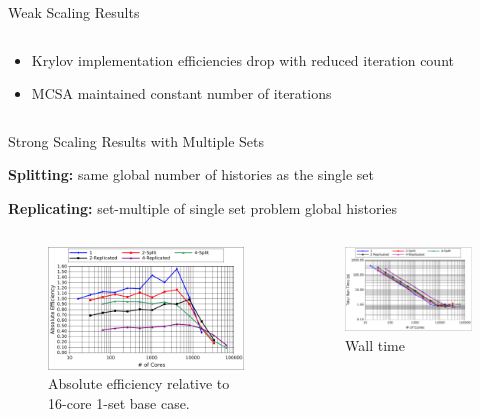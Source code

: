\documentclass{beamer}
\begin{document}
\begin{frame}{Weak Scaling Results}
\begin{columns}
\begin{column}{0.5\textwidth}
      {\small
        \begin{itemize}
        \item Krylov implementation efficiencies drop with
          reduced iteration count
        \item MCSA maintained constant number of iterations
        \end{itemize}
      }

    \end{column}
  \end{columns}


\end{frame}

\begin{frame}{Strong Scaling Results with Multiple Sets}

  \textbf{Splitting:} same global number of histories as the single
  set

  \bigskip 

  \textbf{Replicating:} set-multiple of single set problem global
  histories

  \begin{columns}
    \begin{column}{0.5\textwidth}

      \begin{figure}[htpb!]
        \begin{center}
          \includegraphics[width=2.35in]{titan_strong_ms_eff.pdf}
        \end{center}
        \caption{\small{Absolute efficiency relative to 16-core 1-set
            base case.}}
      \end{figure}

    \end{column}

    \begin{column}{0.5\textwidth}

      \begin{figure}[htpb!]
        \begin{center}
          \includegraphics[width=2.35in]{titan_strong_ms_time.pdf}
        \end{center}
        \caption{\small{Wall time}}
      \end{figure}


\end{column}
\end{columns}
\end{frame}
\end{document}
